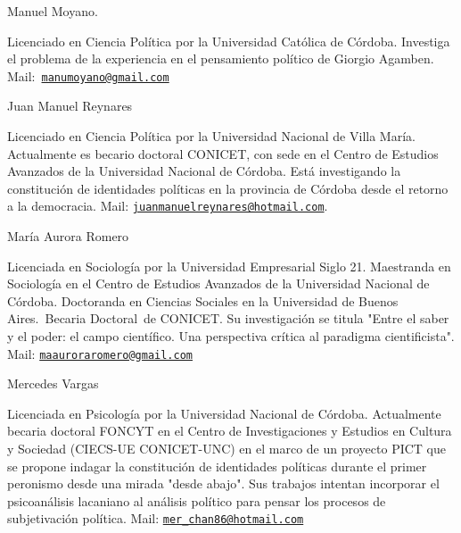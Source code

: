 \documentclass{book}
\begin{document}
Manuel Moyano.

Licenciado en Ciencia Política por la Universidad Católica de Córdoba.
Investiga el problema de la experiencia en el pensamiento político de
Giorgio Agamben.
Mail:~\href{mailto:manumoyano@gmail.com}{\nolinkurl{manumoyano@gmail.com}}~

Juan Manuel Reynares

Licenciado en Ciencia Política por la Universidad Nacional de Villa
María. Actualmente es becario doctoral CONICET, con sede en el Centro de
Estudios Avanzados de la Universidad Nacional de Córdoba. Está
investigando la constitución de identidades políticas en la provincia de
Córdoba desde el retorno a la democracia. Mail:
\href{mailto:juanmanuelreynares@hotmail.com}{\nolinkurl{juanmanuelreynares@hotmail.com}}.

María Aurora Romero

Licenciada en Sociología por la Universidad Empresarial Siglo 21.
Maestranda en Sociología en el Centro de Estudios Avanzados de la
Universidad Nacional de Córdoba. Doctoranda en Ciencias Sociales en la
Universidad de Buenos Aires.~Becaria Doctoral~de CONICET. Su
investigación se titula "Entre el saber y el poder: el campo científico.
Una perspectiva crítica al paradigma cientificista". Mail:
\href{mailto:maauroraromero@gmail.com}{\nolinkurl{maauroraromero@gmail.com}}

Mercedes Vargas

Licenciada en Psicología por la Universidad Nacional de Córdoba.
Actualmente becaria doctoral FONCYT en el Centro de Investigaciones y
Estudios en Cultura y Sociedad (CIECS-UE CONICET-UNC) en el marco de un
proyecto PICT que se propone indagar la constitución de identidades
políticas durante el primer peronismo desde una mirada "desde abajo".
Sus trabajos intentan incorporar el psicoanálisis lacaniano al análisis
político para pensar los procesos de subjetivación política. Mail:
\href{mailto:mer_chan86@hotmail.com}{\nolinkurl{mer\_chan86@hotmail.com}}
\end{document}
